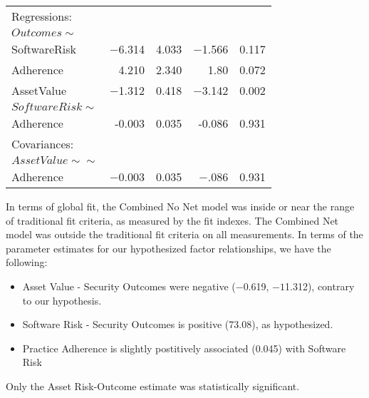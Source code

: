 \begin{table}
\begin{center}
\begin{tabular}{l|rrrr}
			Regressions:  & & & & \\  
			$Outcomes \sim$         & & & & \\                                     
			SoftwareRisk   &  $-$6.314 &   4.033 & $-$1.566 &   0.117 \\
			Adherence       &  4.210  & 2.340  &  1.80  &  0.072\\
			AssetValue     &   $-$1.312  &  0.418  &  $-$3.142 &   0.002\\
			$SoftwareRisk \sim$        & & & & \\                                  
			Adherence     &    -0.003 &   0.035  &  -0.086 &   0.931\\
			Covariances:  & & & & \\  
			$AssetValue \sim\sim$          & & & & \\                                 
			Adherence     &    $-$0.003 &   0.035  &  $-$.086 &   0.931\\
		\end{tabular}
	\end{center}
\end{table}

In terms of global fit, the Combined No Net model was inside or near the range of traditional fit criteria, as measured by the fit indexes. The Combined Net model was outside the traditional fit criteria on all measurements. In terms of the parameter estimates for our hypothesized factor relationships, we have the following:
\begin{itemize}
	\item  Asset Value - Security Outcomes were negative ($-$0.619, $-1$1.312), contrary to our hypothesis. 
	\item Software Risk - Security Outcomes is positive (73.08), as hypothesized. 
	\item Practice Adherence is slightly postitively associated (0.045) with Software Risk 
\end{itemize}	
Only the Asset Risk-Outcome estimate was statistically significant.